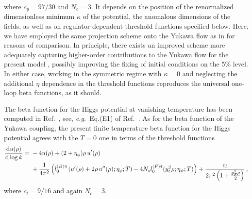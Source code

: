 \documentclass[aps,prd,11pt,tightenlines,superscriptaddress,nofootinbib,preprintnumbers,notitlepage]{revtex4-1}
\newcommand{\eg}{\textsl{e.g.}\;}
\begin{document}
%
where $c_y=97/30$ and $N_c=3$. It depends on the position of the
renormalized dimensionless minimum $\kappa$ of the potential, the
anomalous dimensions of the fields, as well as on regulator-dependent
threshold functions specified below. Here, we have employed the same
projection scheme onto the Yukawa flow as in \cite{our_paper} for
reasons of comparison. In principle, there exists an improved scheme
\cite{Pawlowski:2014zaa} more adequately capturing higher-order
contributions to the Yukawa flow for the present model
\cite{Gies:2017zwf}, possibly improving the fixing of initial
conditions on the 5\% level. In either case, working in the symmetric
regime with $\kappa=0$ and neglecting the additional $\eta$ dependence
in the threshold functions reproduces the universal one-loop beta
functions, as it should.

The beta function for the Higgs potential at vanishing temperature has
been computed in Ref.~\cite{our_paper,Gies:2013fua}, see, \eg~Eq.(E1)
of Ref.~\cite{our_paper}. As for the beta function of the Yukawa
coupling, the present finite temperature beta function for the Higgs potential 
agrees with the $T=0$ one in terms of the threshold functions
%
\begin{align} \label{eq:flow-eq-pot} \frac{\mathrm d u (\rho)}{\mathrm
    d \log k}={}& -4 u(\rho) +(2+\eta_\phi) \rho\, u'(\rho) \notag
  \\&+\frac{1}{4\pi^2}\left( l_0^{(B)4}\left(u'(\rho)+2 \rho\,
      u''(\rho);\eta_\phi;T\right) - 4 N_c l_0^{(F)4}(y_t^2\rho
    ;\eta_\psi;T)\right) +\frac {c_l}{2 \pi ^2 \left(1 + \frac{g_F^2
        \rho}{2}\right)} \,,
\end{align}
%
where $c_l=9/16$ and again $N_c=3$.
\end{document}
